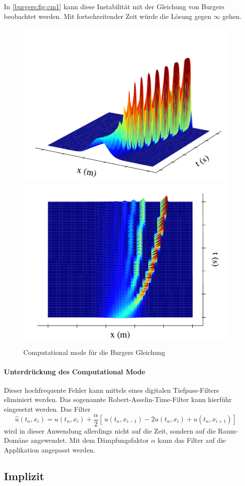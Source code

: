 	In \autoref{burgers:fig:cm1} kann diese Instabilit\"at mit der Gleichung von Burgers beobachtet werden.
	Mit fortschreitender Zeit w\"urde die L\"osung gegen $\infty$ gehen.


  \begin{figure}
	\centering
	\includegraphics[width=.49\textwidth]{papers/burgers/BurgersEquation/images/Leap_Frog_front.pdf}
	\includegraphics[width=.49\textwidth]{papers/burgers/BurgersEquation/images/Leap_Frog_top.pdf}
	\caption{Computational mode für die Burgers Gleichung}
	\label{burgers:fig:cm1}
	\end{figure}

	\paragraph{Unterdrückung des Computational Mode}
	\label{burgers:sec:cm}

	Dieser hochfrequente Fehler kann mittels eines digitalen Tiefpass-Filters eliminiert werden.
	Das sogenannte Robert-Asselin-Time-Filter \cite{burgers:time_filter} kann hierf\"uhr eingesetzt werden.
	Das Filter
		\begin{equation}
			\hat{u}(t_n,x_i) = u(t_n,x_i)+ \frac{\alpha}{2} [ \, u(t_n,x_{i-1}) - 2u(t_n,x_i)+u(t_n,x_{i+1}) ] \,
		\end{equation}
	wird in dieser Anwendung allerdings nicht auf die Zeit, sondern auf die Raum-Dom\"ane angewendet.
	Mit dem D\"ampfungsfaktor $\alpha$ kann das Filter auf die Applikation angepasst werden.

\subsection{Implizit}

